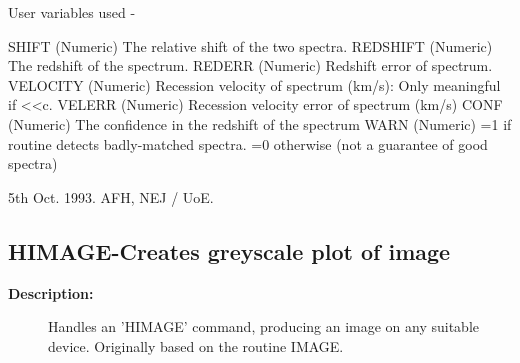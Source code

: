 \begin{description}
\begin{description}
\begin{terminalv}
 User variables used -

 SHIFT       (Numeric) The relative shift of the two spectra.
 REDSHIFT    (Numeric) The redshift of the spectrum.
 REDERR      (Numeric) Redshift error of spectrum.
 VELOCITY    (Numeric) Recession velocity of spectrum (km/s):
                       Only meaningful if <<c.
 VELERR      (Numeric) Recession velocity error of spectrum (km/s)
 CONF        (Numeric) The confidence in the redshift of the spectrum
 WARN        (Numeric) =1 if routine detects badly-matched spectra.
                       =0 otherwise (not a guarantee of good spectra)

 5th  Oct. 1993. AFH, NEJ / UoE.

\end{terminalv}
\end{description}
\subsection{HIMAGE-\label{HIMAGE}Creates greyscale plot of image}
\begin{description}

\item [\textbf{Description:}]
     Handles an 'HIMAGE' command, producing an image on any suitable
     device. Originally based on the routine IMAGE.


\end{description}
\end{description}

